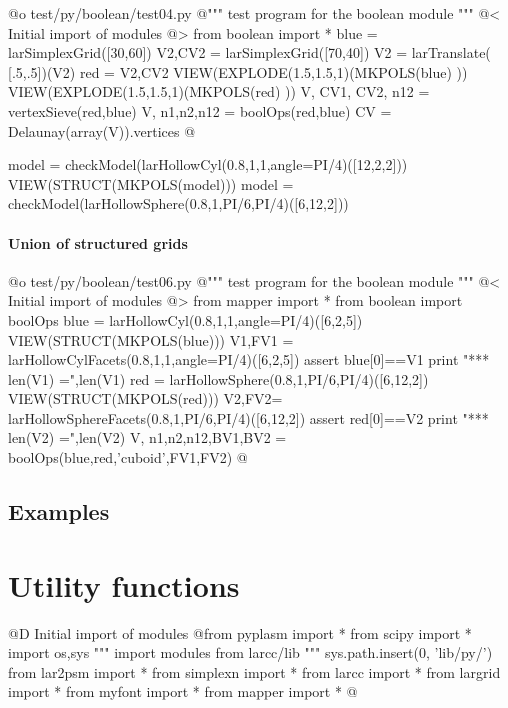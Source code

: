 \documentclass[11pt,oneside]{article}	%
\begin{document}
@o test/py/boolean/test04.py
@{""" test program for the boolean module """
@< Initial import of modules @>
from boolean import *
blue = larSimplexGrid([30,60])
V2,CV2 = larSimplexGrid([70,40])
V2 = larTranslate( [.5,.5])(V2)
red = V2,CV2
VIEW(EXPLODE(1.5,1.5,1)(MKPOLS(blue) ))
VIEW(EXPLODE(1.5,1.5,1)(MKPOLS(red) ))
V, CV1, CV2, n12 = vertexSieve(red,blue)
V, n1,n2,n12 = boolOps(red,blue)
CV = Delaunay(array(V)).vertices
@}


model = checkModel(larHollowCyl(0.8,1,1,angle=PI/4)([12,2,2]))
VIEW(STRUCT(MKPOLS(model)))
model = checkModel(larHollowSphere(0.8,1,PI/6,PI/4)([6,12,2]))


\paragraph{Union of structured grids}

@o test/py/boolean/test06.py
@{""" test program for the boolean module """
@< Initial import of modules @>
from mapper import *
from boolean import boolOps
blue = larHollowCyl(0.8,1,1,angle=PI/4)([6,2,5])
VIEW(STRUCT(MKPOLS(blue)))
V1,FV1 = larHollowCylFacets(0.8,1,1,angle=PI/4)([6,2,5])
assert blue[0]==V1
print "*** len(V1) =",len(V1)
red = larHollowSphere(0.8,1,PI/6,PI/4)([6,12,2])
VIEW(STRUCT(MKPOLS(red)))
V2,FV2= larHollowSphereFacets(0.8,1,PI/6,PI/4)([6,12,2])
assert red[0]==V2
print "*** len(V2) =",len(V2)
V, n1,n2,n12,BV1,BV2 = boolOps(blue,red,'cuboid',FV1,FV2)
@}

\subsection{Examples}
\appendix
\section{Utility functions}
@D Initial import of modules
@{from pyplasm import *
from scipy import *
import os,sys
""" import modules from larcc/lib """
sys.path.insert(0, 'lib/py/')
from lar2psm import *
from simplexn import *
from larcc import *
from largrid import *
from myfont import *
from mapper import *
@}
\end{document}
